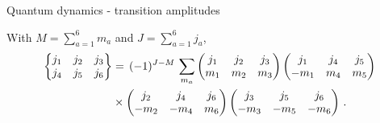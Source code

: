\documentclass{beamer}
\begin{document}
\begin{frame}{Quantum dynamics - transition amplitudes}
\begin{list}{\maltese}{\leftmargin=1em \itemindent=0em}
        \item<3-> With $M=\sum_{a=1}^{6}m_a$ and $J=\sum_{a=1}^{6}j_a$,
        \vspace{-3pt}
        \begin{align}
            \begin{Bmatrix}
                j_1 & j_2 & j_3 \\
                j_4 & j_5 & j_6
            \end{Bmatrix}
            &=\,(-1)^{J-M}\,\sum_{m_a}
            \begin{pmatrix}
                j_1 & j_2 & j_3 \\
                m_1 & m_2 & m_3
            \end{pmatrix}
            \begin{pmatrix}
                j_1 & j_4 & j_5 \\
                -m_1 & m_4 & m_5
            \end{pmatrix}\notag\\
            &\times
            \begin{pmatrix}
                j_2 & j_4 & j_6 \\
                -m_2 & -m_4 & m_6
            \end{pmatrix}
            \begin{pmatrix}
                j_3 & j_5 & j_6 \\
                -m_3 & -m_5 & -m_6
            \end{pmatrix}\,.
        \end{align}
    \end{list}
\end{frame}
\end{document}
